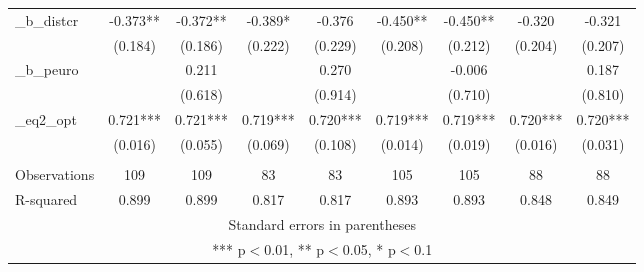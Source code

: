 \documentclass[]{article}
\begin{document}
\begin{tabular}{lcccccccc}
\_b\_distcr & -0.373** & -0.372** & -0.389* & -0.376 & -0.450** & -0.450** & -0.320 & -0.321 \\
 & (0.184) & (0.186) & (0.222) & (0.229) & (0.208) & (0.212) & (0.204) & (0.207) \\
\_b\_peuro &  & 0.211 &  & 0.270 &  & -0.006 &  & 0.187 \\
 &  & (0.618) &  & (0.914) &  & (0.710) &  & (0.810) \\
\_eq2\_opt & 0.721*** & 0.721*** & 0.719*** & 0.720*** & 0.719*** & 0.719*** & 0.720*** & 0.720*** \\
 & (0.016) & (0.055) & (0.069) & (0.108) & (0.014) & (0.019) & (0.016) & (0.031) \\
 &  &  &  &  &  &  &  &  \\
Observations & 109 & 109 & 83 & 83 & 105 & 105 & 88 & 88 \\
 R-squared & 0.899 & 0.899 & 0.817 & 0.817 & 0.893 & 0.893 & 0.848 & 0.849 \\ \hline
\multicolumn{9}{c}{ Standard errors in parentheses} \\
\multicolumn{9}{c}{ *** p$<$0.01, ** p$<$0.05, * p$<$0.1} \\
\end{tabular}
\end{document}
